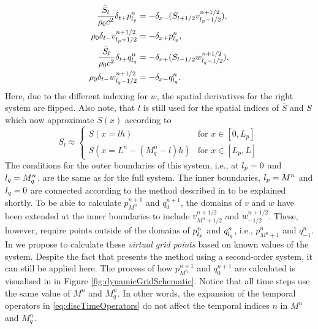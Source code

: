 \begin{subequations}\label{eq:firstOrderPairs}
    \begin{align}
        \frac{\bar S_{l}}{\rho_0 c^2}\delta_{t+}p_{l_p}^n &= -\delta_{x-}(S_{{l}+1/2}v_{{l_p}+1/2}^{n+1/2}),\label{eq:discPressureP}\\
        \rho_0 \delta_{t-}v_{{l_p}+1/2}^{n+1/2}&=-\delta_{x+}p_{l_p}^n,\label{eq:discVelocityV}\\
        \frac{\bar S_{l}}{\rho_0 c^2}\delta_{t+}q_{l_q}^n &= -\delta_{x+}(S_{{l}-1/2}w_{{l_q}-1/2}^{n+1/2}),\label{eq:discPressureQ}\\
        \rho_0 \delta_{t-}w_{{l_q}-1/2}^{n+1/2}&=-\delta_{x-}q_{l_q}^n.\label{eq:discVelocityW}
    \end{align}
\end{subequations}
Here, due to the different indexing for $w$, the spatial derivatives for the right system are flipped. Also note, that $l$ is still used for the spatial indices of $\bar S$ and $S$ which now approximate $S(x)$ according to
\begin{equation}
S_l \approx \begin{cases}
     S(x=lh) & \text{for } x\in [0, L_p]\\
     S(x=L^n-(M_q^n-l)h) & \text{for } x\in [L_p, L]
\end{cases}
\end{equation} 
The conditions for the outer boundaries of this system, i.e., at ${l_p} = 0$ and ${l_q} = M_q^n$, are the same as for the full system. The inner boundaries, ${l_p} = M^n$ and ${l_q} = 0$ are connected according to the method described in \cite{Willemsen2021} to be explained shortly.
To be able to calculate $p_{M^n}^{n+1}$ and $q_0^{n+1}$, the domains of $v$ and $w$ have been extended at the inner boundaries to include $v_{M^n+1/2}^{n+1/2}$ and $w_{-1/2}^{n+1/2}$. These, however, require points outside of the domains of $p_{l_p}^n$ and $q_{l_q}^n$, i.e., $p_{M^n+1}^n$ and $q_{-1}^n$. In \cite{Willemsen2021} we propose to calculate these \textit{virtual grid points} based on known values of the system. Despite the fact that \cite{Willemsen2021} presents the method using a second-order system, it can still be applied here. The process of how $p_{M^n}^{n+1}$ and $q_0^{n+1}$ are calculated is visualised in in Figure \ref{fig:dynamicGridSchematic}. Notice that all time steps use the same value of $M^n$ and $M_q^n$. In other words, the expansion of the temporal operators in \eqref{eq:discTimeOperators} do not affect the temporal indices $n$ in $M^n$ and $M_q^n$.

